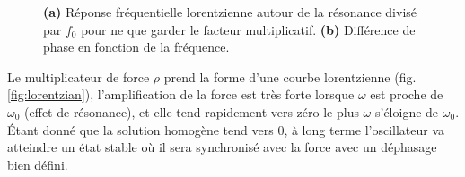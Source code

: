 \begin{figure}[!t]
    \caption{\textbf{(a)} Réponse fréquentielle lorentzienne autour de la résonance divisé par $f_0$ pour ne que garder le facteur multiplicatif. \textbf{(b)} Différence de phase en fonction de la fréquence.}

\end{figure}
%
Le multiplicateur de force $\rho$ prend la forme d’une courbe lorentzienne (fig. \ref{fig:lorentzian}), l’amplification 
de la force est très forte lorsque $\omega$ est proche de $\omega_0$ 
(effet de résonance), et elle tend rapidement vers zéro 
le plus $\omega$ s’éloigne de $\omega_0$.
%
Étant donné que la solution homogène tend vers $0$, à long terme l'oscillateur va atteindre un état stable où il sera synchronisé avec la force
avec un déphasage bien défini.